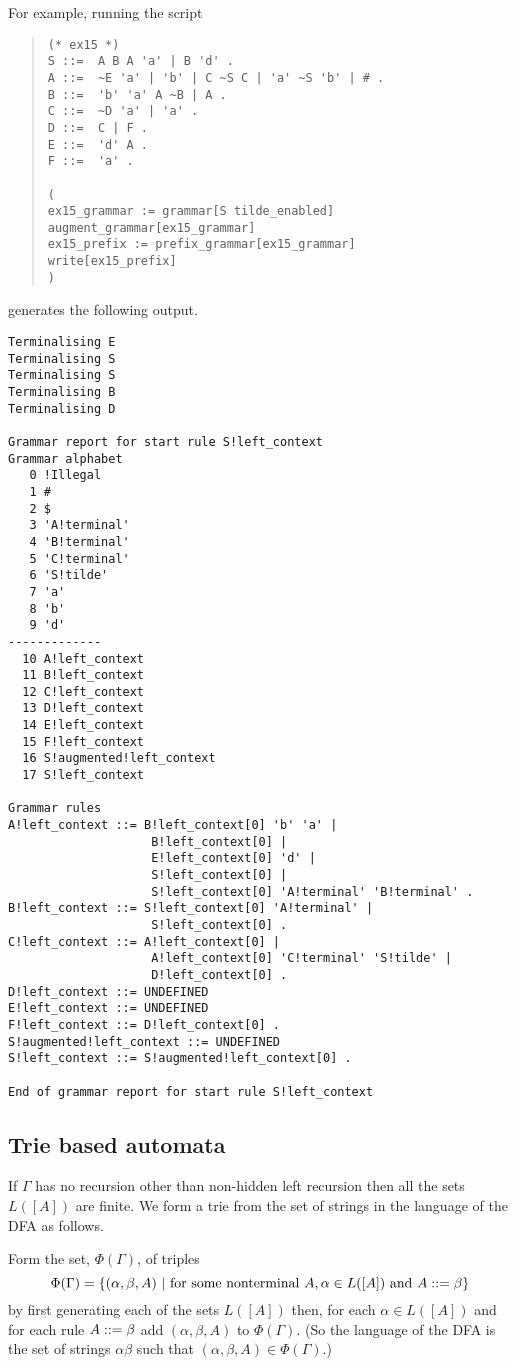 For example, running the script
\begin{quote}
\begin{verbatim}
(* ex15 *)
S ::=  A B A 'a' | B 'd' .
A ::=  ~E 'a' | 'b' | C ~S C | 'a' ~S 'b' | # .
B ::=  'b' 'a' A ~B | A .
C ::=  ~D 'a' | 'a' .
D ::=  C | F .
E ::=  'd' A .
F ::=  'a' .

(
ex15_grammar := grammar[S tilde_enabled]
augment_grammar[ex15_grammar]
ex15_prefix := prefix_grammar[ex15_grammar]
write[ex15_prefix]
)
\end{verbatim}
\end{quote}
generates the following output.
{\small
\begin{verbatim}
Terminalising E
Terminalising S
Terminalising S
Terminalising B
Terminalising D

Grammar report for start rule S!left_context
Grammar alphabet
   0 !Illegal
   1 #
   2 $
   3 'A!terminal'
   4 'B!terminal'
   5 'C!terminal'
   6 'S!tilde'
   7 'a'
   8 'b'
   9 'd'
-------------
  10 A!left_context
  11 B!left_context
  12 C!left_context
  13 D!left_context
  14 E!left_context
  15 F!left_context
  16 S!augmented!left_context
  17 S!left_context

Grammar rules
A!left_context ::= B!left_context[0] 'b' 'a' |
                    B!left_context[0] |
                    E!left_context[0] 'd' |
                    S!left_context[0] |
                    S!left_context[0] 'A!terminal' 'B!terminal' .
B!left_context ::= S!left_context[0] 'A!terminal' |
                    S!left_context[0] .
C!left_context ::= A!left_context[0] |
                    A!left_context[0] 'C!terminal' 'S!tilde' |
                    D!left_context[0] .
D!left_context ::= UNDEFINED
E!left_context ::= UNDEFINED
F!left_context ::= D!left_context[0] .
S!augmented!left_context ::= UNDEFINED
S!left_context ::= S!augmented!left_context[0] .

End of grammar report for start rule S!left_context
\end{verbatim}%
}

\subsection{Trie based automata}

If $\Gamma$ has no recursion other 
than non-hidden left recursion then all the sets $L([A])$ are finite.
We form a trie from the set of strings in the language of the DFA
as follows.

Form the set, $\Phi(\Gamma)$, of triples
$$
\Phi(\Gamma)=\{(\alpha,\beta,A)\ |\ {\rm for\ some\ nonterminal\ } A,
\alpha\in L([A]) {\rm \ and\ } A\pdn\beta\}
$$
by first generating each of the sets $L([A])$ 
then, for each $\alpha\in L([A])$ and for each rule $A::=\beta$ 
add $(\alpha,\beta,A)$ to $\Phi(\Gamma)$.
(So the language of the DFA is the set of strings $\alpha\beta$ such
that $(\alpha,\beta,A)\in \Phi(\Gamma)$.)

